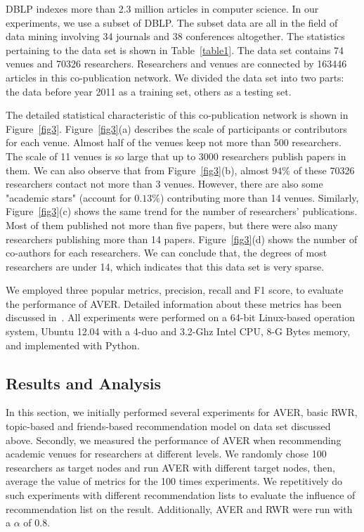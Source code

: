 \documentclass[9pt]{acm_proc_article-sp}
\begin{document}
DBLP indexes more than 2.3 million articles in computer science. In our experiments, we use a subset of DBLP. The subset data are all in the field of data mining involving 34 journals and 38 conferences altogether. The statistics pertaining to the data set is shown in Table~\ref{table1}. The data set contains 74 venues and 70326 researchers. Researchers and venues are connected by 163446 articles in this co-publication network. We divided the data set into two parts: the data before year 2011 as a training set, others as a testing set.

The detailed statistical characteristic of this co-publication network is shown in Figure~\ref{fig3}. Figure~\ref{fig3}(a) describes the scale of participants or contributors for each venue. Almost half of the venues keep not more than 500 researchers. The scale of 11 venues is so large that up to 3000 researchers publish papers in them. We can also observe that from Figure~\ref{fig3}(b), almost $94\%$ of these 70326 researchers contact not more than 3 venues. However, there are also some "academic stars" (account for $0.13\%$) contributing more than 14 venues. Similarly, Figure~\ref{fig3}(c) shows the same trend for the number of researchers' publications. Most of them published not more than five papers, but there were also many researchers publishing more than 14 papers. Figure~\ref{fig3}(d) shows the number of co-authors for each researchers. We can conclude that, the degrees of most researchers are under 14, which indicates that this data set is very sparse.

We employed three popular metrics, precision, recall and F1 score, to evaluate the performance of AVER. Detailed information about these metrics has been discussed in~\cite{xia2014mvcwalker}. All experiments were performed on a 64-bit Linux-based operation system, Ubuntu 12.04 with a 4-duo and 3.2-Ghz Intel CPU, 8-G Bytes memory, and implemented with Python.

\subsection{Results and Analysis}
In this section, we initially performed several experiments for AVER, basic RWR, topic-based and friends-based recommendation model on data set discussed above. Secondly, we measured the performance of AVER when recommending academic venues for researchers at different levels. We randomly chose 100 researchers as target nodes and run AVER with different target nodes, then, average the value of metrics for the 100 times experiments. We repetitively do such experiments with different recommendation lists to evaluate the influence of recommendation list on the result. Additionally, AVER and RWR were run with a $\alpha$ of 0.8.
\end{document}
